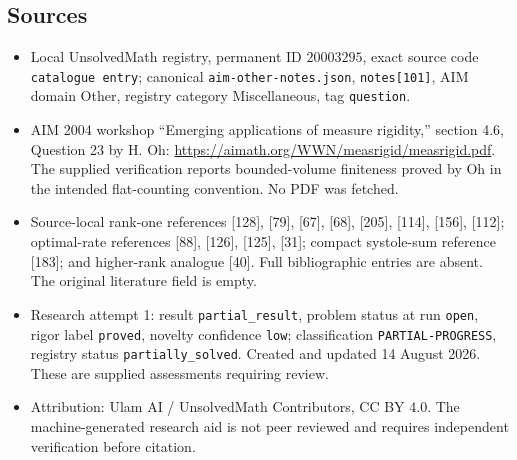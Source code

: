 \documentclass[11pt]{article}
\begin{document}
\subsection{Sources}
\begin{itemize}
\item Local UnsolvedMath registry, permanent ID \(20003295\), exact source code \texttt{catalogue entry}; canonical \texttt{aim-other-notes.json}, \texttt{notes[101]}, AIM domain Other, registry category Miscellaneous, tag \texttt{question}.
\item AIM 2004 workshop ``Emerging applications of measure rigidity,'' section 4.6, Question 23 by H. Oh: \url{https://aimath.org/WWN/measrigid/measrigid.pdf}. The supplied verification reports bounded-volume finiteness proved by Oh in the intended flat-counting convention. No PDF was fetched.
\item Source-local rank-one references [128], [79], [67], [68], [205], [114], [156], [112]; optimal-rate references [88], [126], [125], [31]; compact systole-sum reference [183]; and higher-rank analogue [40]. Full bibliographic entries are absent. The original literature field is empty.
\item Research attempt 1: result \texttt{partial\_result}, problem status at run \texttt{open}, rigor label \texttt{proved}, novelty confidence \texttt{low}; classification \texttt{PARTIAL-PROGRESS}, registry status \texttt{partially\_solved}. Created and updated 14 August 2026. These are supplied assessments requiring review.
\item Attribution: Ulam AI / UnsolvedMath Contributors, CC BY 4.0. The machine-generated research aid is not peer reviewed and requires independent verification before citation.
\end{itemize}
\end{document}
